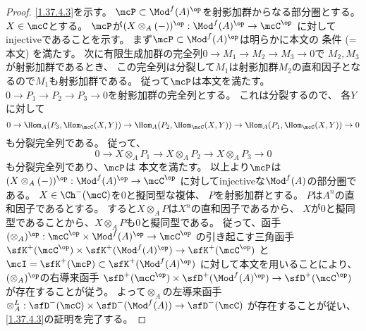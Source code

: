 \documentclass[uplatex,dvipdfmx]{jsarticle}
\begin{document}
\begin{proof}
  \ref{1.37.4.3}を示す。
  \(\mcP\subset \Mod^f(A)^{\op}\)を射影加群からなる部分圏とする。
  \(X\in \mcC\)とする。
  \(\mcP\)が\((X\otimes_A (-))^{\op}:\Mod^f(A)^{\op}\to \mcC^{\op}\)
  に対してinjectiveであることを示す。
  まず\(\mcP\subset \Mod^f(A)^{\op}\)は明らかに本文の
  条件\cite[(1.7.5)]{kashiwara2002sheaves}
  (=本文\cite[Definition 1.8.2 (i)]{kashiwara2002sheaves}) を満たす。
  次に有限生成加群の完全列\(0\to M_1\to M_2\to M_3\to 0\)で
  \(M_2,M_3\)が射影加群であるとき、
  この完全列は分裂して\(M_1\)は射影加群\(M_2\)の直和因子となるので\(M_1\)も射影加群である。
  従って\(\mcP\)は本文\cite[Definition 1.8.2 (ii)]{kashiwara2002sheaves}を満たす。
  \(0\to P_1\to P_2\to P_3\to 0\)を射影加群の完全列とする。
  これは分裂するので、
  各\(Y\)に対して
  \[
  0\to \Hom_A(P_3,\Hom_{\mcC}(X,Y))
  \to \Hom_A(P_2,\Hom_{\mcC}(X,Y))
  \to \Hom_A(P_1,\Hom_{\mcC}(X,Y)) \to 0
  \]
  も分裂完全列である。
  従って、
  \[0\to X\otimes_A P_1\to X\otimes_A P_2\to X\otimes_A P_3\to 0\]
  も分裂完全列であり、\(\mcP\)は
  本文\cite[Definition 1.8.2 (iii)]{kashiwara2002sheaves}を満たす。
  以上より\(\mcP\)は\((X\otimes_A (-))^{\op}:\Mod^f(A)^{\op}\to \mcC^{\op}\)
  に対してinjectiveな\(\Mod^f(A)\)の部分圏である。
  \(X\in \Ch^-(\mcC)\)を\(0\)と擬同型な複体、
  \(P\)を射影加群とする。
  \(P\)は\(A^n\)の直和因子であるとする。
  すると\(X\otimes_A P\)は\(X^n\)の直和因子であるから、
  \(X\)が\(0\)と擬同型であることから、\(X\otimes_A P\)も\(0\)と擬同型である。
  従って、函手\((\otimes_A)^{\op}:\mcC^{\op}\times \Mod^f(A)^{\op}\to \mcC^{\op}\)
  の引き起こす三角函手
  \(\sfK^+(\mcC^{\op}) \times \sfK^+(\Mod^f(A)^{\op})\to \sfK^+(\mcC^{\op})\)
  と\(\mcI = \sfK^+(\mcP)\subset \sfK^+(\Mod^f(A)^{\op})\)
  に対して本文\cite[Corollary 1.10.5]{kashiwara2002sheaves}を用いることにより、
  \((\otimes_A)^{\op}\)の右導来函手
  \(\sfD^+(\mcC^{\op}) \times \sfD^+(\Mod^f(A)^{\op})\to \sfD^+(\mcC^{\op})\)
  が存在することが従う。
  よって\(\otimes_A\)の左導来函手
  \(\otimes_A^L:\sfD^-(\mcC) \times \sfD^-(\Mod^f(A))\to \sfD^-(\mcC)\)
  が存在することが従い、
  \ref{1.37.4.3}の証明を完了する。


\end{proof}
\end{document}
